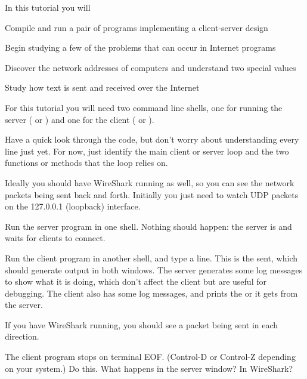 










In this tutorial you will

\DOT Compile and run a pair of programs implementing a client-server design

\DOT Begin studying a few of the problems that can occur in Internet programs

\DOT Discover the network addresses of computers and understand two special values

\DOT Study how text is sent and received over the Internet



For this tutorial you will need two command line shells, one for running
the server ( or ) and one for the client
( or ).

Have a quick look through the code, but don't worry about understanding every
line just yet. For now, just identify the main client or server loop and the two
functions or methods that the loop relies on.

Ideally you should have WireShark running as well, so you can see the network
packets being sent back and forth. Initially you just need to watch UDP packets
on the 127.0.0.1 (loopback) interface.

Run the server program in one shell. Nothing should happen: the server is 
and waits for clients to connect.

Run the client program in another shell, and type a line. This is the 
sent, which should generate output in both windows.
The server generates some log messages to show what it is doing, which don't affect
the client but are useful for debugging. The client also has some log messages, and
prints the  or  it gets from the server.

If you have WireShark running, you should see a packet being sent in each direction.

The client program stops on terminal EOF. (Control-D or Control-Z depending on your
system.) Do this. What happens in the server window? In WireShark?

